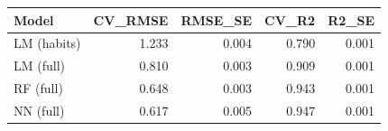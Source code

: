 
\begin{tabular}{lrrrr}
\toprule
Model & CV\_RMSE & RMSE\_SE & CV\_R2 & R2\_SE\\
\midrule
LM (habits) & 1.233 & 0.004 & 0.790 & 0.001\\
LM (full) & 0.810 & 0.003 & 0.909 & 0.001\\
RF (full) & 0.648 & 0.003 & 0.943 & 0.001\\
NN (full) & 0.617 & 0.005 & 0.947 & 0.001\\
\bottomrule
\end{tabular}
